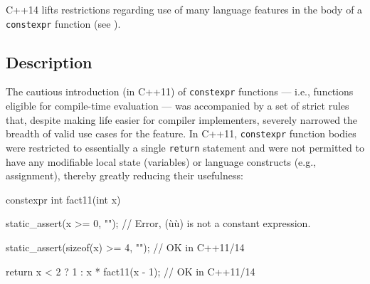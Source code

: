 

\setcounter{table}{0}
\setcounter{footnote}{0}
\setcounter{lstlisting}{0}


C++14 lifts restrictions regarding use of many language features in the
body of a \lstinline!constexpr! function (see ).

\subsection[Description]{Description}\label{description}

The cautious introduction (in C++11) of \lstinline!constexpr!
functions --- i.e., functions eligible for compile-time evaluation
--- was accompanied by a set of strict rules that, despite making life
easier for compiler implementers, severely narrowed the breadth of valid
use cases for the feature. In C++11, \lstinline!constexpr!
function bodies were restricted to essentially a single
\lstinline!return! statement and were not permitted to have any modifiable
local state (variables) or  language constructs
(e.g., assignment), thereby greatly reducing their \mbox{usefulness}:

\begin{emcppslisting}
constexpr int fact11(int x)
{
    static_assert(x >= 0, "");
        // Error, (ù{}ù) is not a constant expression.

    static_assert(sizeof(x) >= 4, "");  // OK in C++11/14

    return x < 2 ? 1 : x * fact11(x - 1);  // OK in C++11/14
}
\end{emcppslisting}
    
